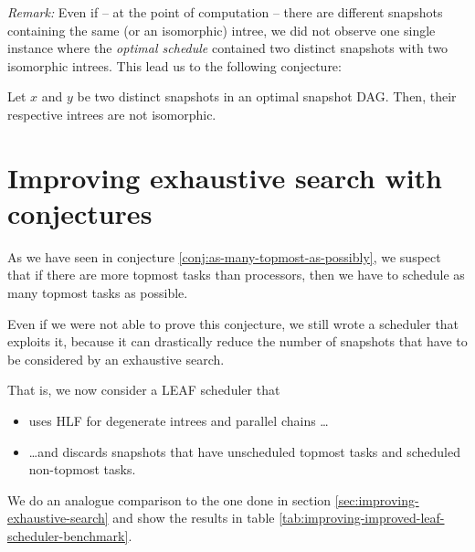 \emph{Remark:} Even if -- at the point of computation -- there are different snapshots containing the same (or an isomorphic) intree, we did not observe one single instance where the \emph{optimal schedule} contained two distinct snapshots with two isomorphic intrees. This lead us to the following conjecture:

\begin{conjecture}
  Let $x$ and $y$ be two distinct snapshots in an optimal snapshot DAG. Then, their respective intrees are not isomorphic.
\end{conjecture}

\section{Improving exhaustive search with conjectures}
\label{sec:improving-leaf-with-conjectures}

As we have seen in conjecture \ref{conj:as-many-topmost-as-possibly}, we suspect that if there are more topmost tasks than processors, then we have to schedule as many topmost tasks as possible. 

Even if we were not able to prove this conjecture, we still wrote a scheduler that exploits it, because it can drastically reduce the number of snapshots that have to be considered by an exhaustive search.

That is, we now consider a LEAF scheduler that
\begin{itemize}
\item uses HLF for degenerate intrees and parallel chains \dots
\item \dots and discards snapshots that have unscheduled topmost tasks and scheduled non-topmost tasks.
\end{itemize}

We do an analogue comparison to the one done in section \ref{sec:improving-exhaustive-search} and show the results in table \ref{tab:improving-improved-leaf-scheduler-benchmark}.

